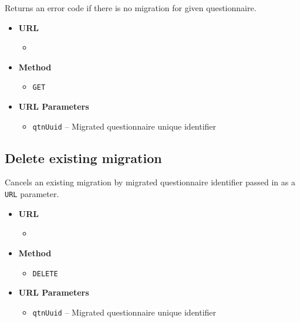 Returns an error code if there is no migration for given questionnaire.

\begin{itemize}
    \item \textbf{URL}
        \begin{itemize}
            \item {}
        \end{itemize}

    \item \textbf{Method}
        \begin{itemize}
            \item \texttt{GET}
        \end{itemize}

    \item \textbf{URL Parameters}
        \begin{itemize}
            \item \texttt{qtnUuid} -- Migrated questionnaire unique identifier
        \end{itemize}
\end{itemize}

\subsection{Delete existing migration}

Cancels an existing migration by migrated questionnaire identifier passed in as a \texttt{URL} parameter.

\begin{itemize}
    \item \textbf{URL}
        \begin{itemize}
            \item {}
        \end{itemize}

    \item \textbf{Method}
        \begin{itemize}
            \item \texttt{DELETE}
        \end{itemize}

    \item \textbf{URL Parameters}
        \begin{itemize}
            \item \texttt{qtnUuid} -- Migrated questionnaire unique identifier
        \end{itemize}
\end{itemize}

